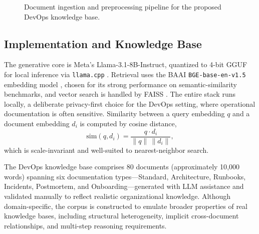 \documentclass[conference]{IEEEtran}
\begin{document}
\begin{figure}[t]
\centering
{}
\caption{Document ingestion and preprocessing pipeline for the proposed DevOps knowledge base.}
\label{fig:ingest}
\end{figure}

\subsection{Implementation and Knowledge Base}
The generative core is Meta's Llama-3.1-8B-Instruct, quantized to 4-bit GGUF for local inference via \texttt{llama.cpp} \cite{meta2024llama3, gerganov2023gguf}. Retrieval uses the BAAI \texttt{BGE-base-en-v1.5} embedding model \cite{baai2023bge, reimers2019sbert}, chosen for its strong performance on semantic-similarity benchmarks, and vector search is handled by FAISS \cite{johnson2019billion}. The entire stack runs locally, a deliberate privacy-first choice for the DevOps setting, where operational documentation is often sensitive. Similarity between a query embedding $q$ and a document embedding $d_i$ is computed by cosine distance,
\begin{equation}
\mathrm{sim}(q, d_i) = \frac{q \cdot d_i}{\lVert q \rVert\, \lVert d_i \rVert},
\end{equation}
which is scale-invariant and well-suited to nearest-neighbor search.

The DevOps knowledge base comprises 80 documents (approximately 10{,}000 words) spanning six documentation types---Standard, Architecture, Runbooks, Incidents, Postmortem, and Onboarding---generated with LLM assistance and validated manually to reflect realistic organizational knowledge. Although domain-specific, the corpus is constructed to emulate broader properties of real knowledge bases, including structural heterogeneity, implicit cross-document relationships, and multi-step reasoning requirements.
\end{document}
